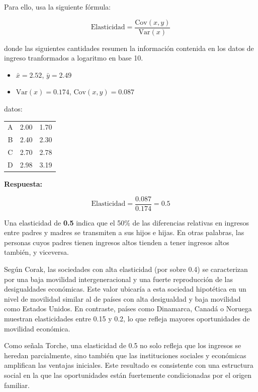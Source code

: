 \documentclass[
]{article}
\providecommand{\tightlist}{%
  \setlength{\itemsep}{0pt}\setlength{\parskip}{0pt}}\usepackage{longtable,booktabs,array}
\begin{document}
Para ello, usa la siguiente fórmula:

\[\text{Elasticidad} = \frac{\text{Cov}(x, y)}{\text{Var}(x)}\]

donde las siguientes cantidades resumen la información contenida en los
datos de ingreso tranformados a logaritmo en base 10.

\begin{itemize}
\tightlist
\item
  \(\bar{x} = 2.52\), \(\bar{y} = 2.49\)
\item
  \(\text{Var}(x) = 0.174\), \(\text{Cov}(x, y) = 0.087\)
\end{itemize}

datos:

\begin{longtable*}[t]{ccc}
\toprule
{} &  & \\
\midrule
A & 2.00 & 1.70\\
B & 2.40 & 2.30\\
C & 2.70 & 2.78\\
D & 2.98 & 3.19\\
\bottomrule
\end{longtable*}

\textbf{Respuesta:}

\[
\text{Elasticidad} = \frac{0.087}{0.174} = 0.5
\]

Una elasticidad de \textbf{0.5} indica que el 50\% de las diferencias
relativas en ingresos entre padres y madres se transmiten a sus hijos e
hijas. En otras palabras, las personas cuyos padres tienen ingresos
altos tienden a tener ingresos altos también, y viceversa.

Según Corak, las sociedades con alta elasticidad (por sobre 0.4) se
caracterizan por una baja movilidad intergeneracional y una fuerte
reproducción de las desigualdades económicas. Este valor ubicaría a esta
sociedad hipotética en un nivel de movilidad similar al de países con
alta desigualdad y baja movilidad como Estados Unidos. En contraste,
países como Dinamarca, Canadá o Noruega muestran elasticidades entre
0.15 y 0.2, lo que refleja mayores oportunidades de movilidad económica.

Como señala Torche, una elasticidad de 0.5 no solo refleja que los
ingresos se heredan parcialmente, sino también que las instituciones
sociales y económicas amplifican las ventajas iniciales. Este resultado
es consistente con una estructura social en la que las oportunidades
están fuertemente condicionadas por el origen familiar.
\end{document}
